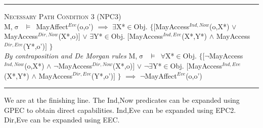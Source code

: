 \documentclass[a4paper,11pt, twoside,twocolumn]{article}
\newenvironment{logic}[1][null]
{\begin{flushleft} \small \label{#1}}
{\end{flushleft}}
\newcommand{\loin}{$\in$}
\newcommand{\loforall}{$\forall$}
\newcommand{\loexists}{$\exists$}
\newcommand{\loand}{$\land$}
\newcommand{\loor} {$\lor$}
\newcommand{\loimplies}{$\implies$}
\newcommand{\losigma}{$\upsigma$}
\newcommand{\loturns} {$\vDash$}
\newcommand{\loneg}{$\boldsymbol \neg$}
\newcommand{\ablock} {\null\qquad}
\begin{document}
\begin{logic}
\hrule\null
\textsc{\normalsize *Necessary Path Condition 3 (NPC3)}\\
M,\losigma\ \loturns\ 
MayAffect$^{Eve}$(o,o')\linebreak
\ablock \loimplies \linebreak
\ablock \loexists X*\loin Obj. $\{[$MayAccess$^{Ind,Now}$(o,X*) \loor \linebreak
\ablock \ablock \ablock  \ablock MayAccess$^{Dir,Now}$(X*,o)$]$\linebreak
\ablock \ablock \ablock \ablock \loor \linebreak
\ablock \ablock \quad \loexists Y*\loin Obj. $[$MayAccess$^{Ind,Eve}$(X*,Y*) \loand\linebreak
\ablock \ablock \ablock \ablock \ablock MayAccess$^{Dir,Eve}$(Y*,o')$]$\linebreak
\ablock \ablock \ablock \ablock  $\}$\linebreak
\linebreak \\
\textit{By contraposition and De Morgan rules}\linebreak
M,\losigma\ \loturns\ 
\loforall X*\loin Obj. $\{[$\loneg MayAccess$^{Ind,Now}$(o,X*) \loand \linebreak
\ablock \ablock \ablock \ablock \quad \loneg MayAccess$^{Dir,Now}$(X*,o)$]$\linebreak
\ablock \ablock \ablock \ablock \loor \linebreak
\ablock \ablock \loneg \loexists Y*\loin Obj. $[$MayAccess$^{Ind,Eve}$(X*,Y*) \loand\linebreak
\ablock \ablock \ablock \ablock \ablock MayAccess$^{Dir,Eve}$(Y*,o')$]$\linebreak
\ablock \ablock \ablock \ablock  $\}$\linebreak
\ablock \loimplies\linebreak
\ablock \loneg MayAffect$^{Eve}$(o,o')\
\linebreak
\hrule
\end{logic}
We are at the finishing line. The Ind,Now predicates can be expanded using GPEC to obtain direct capabilities. Ind,Eve can be expanded using EPC2. Dir,Eve can be expanded using EEC.
\end{document}
